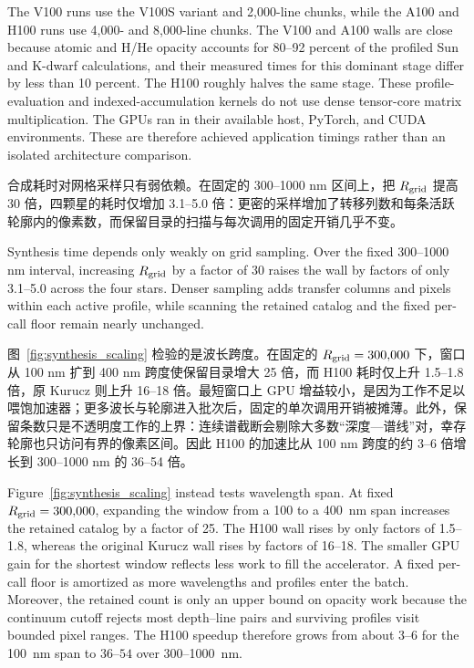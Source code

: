 \begin{EN}
The V100 runs use the V100S variant and 2,000-line chunks, while the A100 and
H100 runs use 4,000- and 8,000-line chunks. The V100 and A100 walls are close
because atomic and H/He opacity accounts for
80--92 percent of the profiled Sun and K-dwarf calculations, and their measured
times for this dominant stage differ by less than 10 percent. The H100 roughly
halves the same stage. These profile-evaluation and indexed-accumulation kernels
do not use dense tensor-core matrix multiplication. The GPUs ran in their
available host, PyTorch, and CUDA environments. These are therefore achieved
application timings rather than an isolated architecture comparison.
\end{EN}

合成耗时对网格采样只有弱依赖。在固定的 300--1000 nm 区间上，把 $R_{\rm grid}$ 提高 30 倍，四颗星的耗时仅增加 3.1--5.0 倍：更密的采样增加了转移列数和每条活跃轮廓内的像素数，而保留目录的扫描与每次调用的固定开销几乎不变。

\begin{EN}
Synthesis time depends only weakly on grid sampling. Over the fixed
300--1000 nm interval, increasing $R_{\rm grid}$ by a
factor of 30 raises the wall by factors of only 3.1--5.0 across the four stars.
Denser sampling adds transfer columns and pixels within each active profile,
while scanning the retained catalog and the fixed per-call floor remain nearly
unchanged.
\end{EN}

图~\ref{fig:synthesis_scaling} 检验的是波长跨度。在固定的 $R_{\rm grid}=300{,}000$ 下，窗口从 100 nm 扩到 400 nm 跨度使保留目录增大 25 倍，而 H100 耗时仅上升 1.5--1.8 倍，原 Kurucz 则上升 16--18 倍。最短窗口上 GPU 增益较小，是因为工作不足以喂饱加速器；更多波长与轮廓进入批次后，固定的单次调用开销被摊薄。此外，保留条数只是不透明度工作的上界：连续谱截断会剔除大多数“深度—谱线”对，幸存轮廓也只访问有界的像素区间。因此 H100 的加速比从 100 nm 跨度的约 3--6 倍增长到 300--1000 nm 的 36--54 倍。

\begin{EN}
Figure~\ref{fig:synthesis_scaling} instead tests wavelength span. At fixed
$R_{\rm grid}=300{,}000$, expanding the window from a 100 to a 400~nm span
increases the retained catalog by a factor of 25. The H100 wall
rises by only factors of 1.5--1.8, whereas the original Kurucz wall rises by
factors of 16--18. The smaller GPU gain for the shortest window reflects less
work to fill the accelerator. A fixed per-call floor is amortized
as more wavelengths and profiles enter the batch. Moreover, the retained count
is only an upper bound on opacity work because the continuum cutoff rejects most
depth--line pairs and surviving profiles visit bounded pixel ranges. The H100
speedup therefore grows from about $3$--$6$ for the 100~nm span to $36$--$54$
over 300--1000~nm.
\end{EN}

